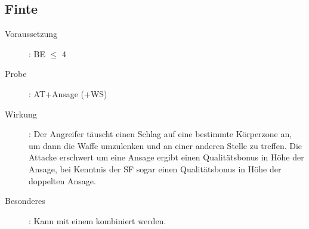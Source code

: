\subsection{Finte}
\label{aktion.finte}
\begin{description}
    \item[Voraussetzung]:
        BE\textrm{ ${\leq}$ }4
    \item[Probe]:
        AT+Ansage (+WS)
    \item[Wirkung]:
        Der Angreifer täuscht einen Schlag auf eine bestimmte Körperzone an, um dann die Waffe umzulenken und an einer anderen Stelle zu treffen.
        Die Attacke erschwert um eine Ansage ergibt einen Qualitätsbonus in Höhe der Ansage, bei Kenntnis der SF  sogar einen Qualitätsbonus in Höhe der doppelten Ansage.
    \item[Besonderes]:
        Kann mit einem  kombiniert werden.
\end{description}
